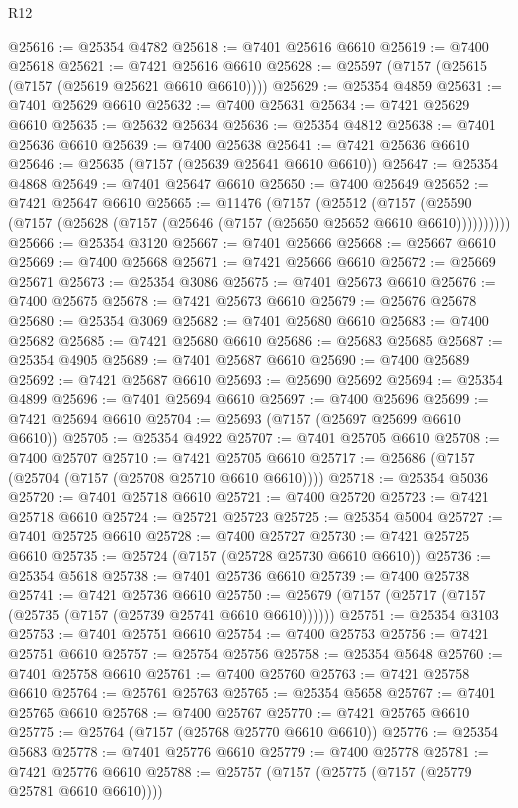 \begin{lexlean}{R12}
\begin{coremodule}
{{{{{{{{{{{{{{{{{{{{{{{{{{{{{{{{{{{{{{{{{{{{{{{{{{{{{{{{{{{{{{{{{{{{{{{{{{{{{{{{{{@25616 := @25354 @4782
@25618 := @7401 @25616 @6610
@25619 := @7400 @25618
@25621 := @7421 @25616 @6610
@25628 := @25597 (@7157 (@25615 (@7157 (@25619 @25621 @6610 @6610))))
@25629 := @25354 @4859
@25631 := @7401 @25629 @6610
@25632 := @7400 @25631
@25634 := @7421 @25629 @6610
@25635 := @25632 @25634
@25636 := @25354 @4812
@25638 := @7401 @25636 @6610
@25639 := @7400 @25638
@25641 := @7421 @25636 @6610
@25646 := @25635 (@7157 (@25639 @25641 @6610 @6610))
@25647 := @25354 @4868
@25649 := @7401 @25647 @6610
@25650 := @7400 @25649
@25652 := @7421 @25647 @6610
@25665 := @11476
    (@7157
      (@25512
        (@7157 (@25590 (@7157 (@25628 (@7157 (@25646 (@7157 (@25650 @25652 @6610 @6610))))))))))
@25666 := @25354 @3120
@25667 := @7401 @25666
@25668 := @25667 @6610
@25669 := @7400 @25668
@25671 := @7421 @25666 @6610
@25672 := @25669 @25671
@25673 := @25354 @3086
@25675 := @7401 @25673 @6610
@25676 := @7400 @25675
@25678 := @7421 @25673 @6610
@25679 := @25676 @25678
@25680 := @25354 @3069
@25682 := @7401 @25680 @6610
@25683 := @7400 @25682
@25685 := @7421 @25680 @6610
@25686 := @25683 @25685
@25687 := @25354 @4905
@25689 := @7401 @25687 @6610
@25690 := @7400 @25689
@25692 := @7421 @25687 @6610
@25693 := @25690 @25692
@25694 := @25354 @4899
@25696 := @7401 @25694 @6610
@25697 := @7400 @25696
@25699 := @7421 @25694 @6610
@25704 := @25693 (@7157 (@25697 @25699 @6610 @6610))
@25705 := @25354 @4922
@25707 := @7401 @25705 @6610
@25708 := @7400 @25707
@25710 := @7421 @25705 @6610
@25717 := @25686 (@7157 (@25704 (@7157 (@25708 @25710 @6610 @6610))))
@25718 := @25354 @5036
@25720 := @7401 @25718 @6610
@25721 := @7400 @25720
@25723 := @7421 @25718 @6610
@25724 := @25721 @25723
@25725 := @25354 @5004
@25727 := @7401 @25725 @6610
@25728 := @7400 @25727
@25730 := @7421 @25725 @6610
@25735 := @25724 (@7157 (@25728 @25730 @6610 @6610))
@25736 := @25354 @5618
@25738 := @7401 @25736 @6610
@25739 := @7400 @25738
@25741 := @7421 @25736 @6610
@25750 := @25679 (@7157 (@25717 (@7157 (@25735 (@7157 (@25739 @25741 @6610 @6610))))))
@25751 := @25354 @3103
@25753 := @7401 @25751 @6610
@25754 := @7400 @25753
@25756 := @7421 @25751 @6610
@25757 := @25754 @25756
@25758 := @25354 @5648
@25760 := @7401 @25758 @6610
@25761 := @7400 @25760
@25763 := @7421 @25758 @6610
@25764 := @25761 @25763
@25765 := @25354 @5658
@25767 := @7401 @25765 @6610
@25768 := @7400 @25767
@25770 := @7421 @25765 @6610
@25775 := @25764 (@7157 (@25768 @25770 @6610 @6610))
@25776 := @25354 @5683
@25778 := @7401 @25776 @6610
@25779 := @7400 @25778
@25781 := @7421 @25776 @6610
@25788 := @25757 (@7157 (@25775 (@7157 (@25779 @25781 @6610 @6610))))
}}}}}}}}}}}}}}}}}}}}}}}}}}}}}}}}}}}}}}}}}}}}}}}}}}}}}}}}}}}}}}}}}}}}}}}}}}}}}}}}}}
\end{coremodule}
\end{lexlean}
